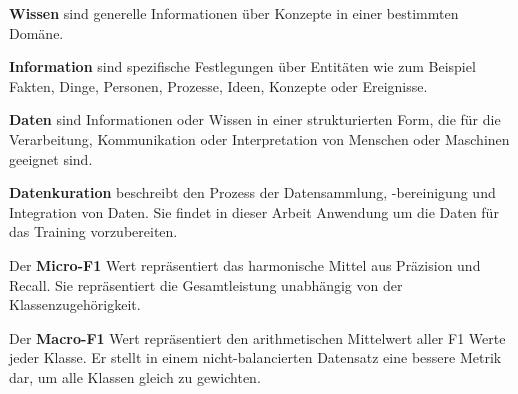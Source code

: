 \begin{definition}\label{def:wissen}
    \textbf{Wissen} sind generelle Informationen über Konzepte in einer bestimmten Domäne.
\end{definition}

\begin{definition}\label{def:information}
    \textbf{Information} sind spezifische Festlegungen über Entitäten wie zum Beispiel Fakten, Dinge, Personen, Prozesse, Ideen, Konzepte oder Ereignisse.
\end{definition}

\begin{definition}\label{def:daten}
    \textbf{Daten} sind Informationen oder Wissen in einer strukturierten Form, die für die Verarbeitung, Kommunikation oder Interpretation von Menschen oder Maschinen geeignet sind.
\end{definition}

\begin{definition}\label{def:datenkuration}
    \textbf{Datenkuration} beschreibt den Prozess der Datensammlung, -bereinigung und Integration von Daten. Sie findet in dieser Arbeit Anwendung um die Daten für das Training vorzubereiten.
\end{definition}

\begin{definition}\label{def:micro-f1}
    Der \textbf{Micro-F1} Wert repräsentiert das harmonische Mittel aus Präzision und Recall.
    Sie repräsentiert die Gesamtleistung unabhängig von der Klassenzugehörigkeit.
\end{definition}

\begin{definition}\label{def:macro-f1}
    Der \textbf{Macro-F1} Wert repräsentiert den arithmetischen Mittelwert aller F1 Werte jeder Klasse. Er stellt in einem nicht-balancierten Datensatz eine bessere Metrik dar, um alle Klassen gleich zu gewichten.
\end{definition}
